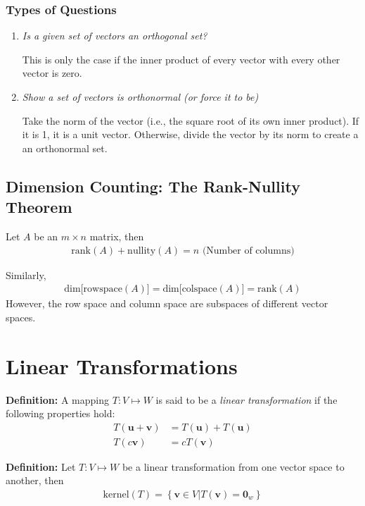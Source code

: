 \documentclass[a4paper,10pt]{report}
\newcommand{\vb}[1]{\mathbf{#1}}		%
\begin{document}
\subsection{Types of Questions}
\begin{enumerate}
	\item
		\textit{Is a given set of vectors an orthogonal set?}

		This is only the case if the inner product of every vector with every other vector is zero.

	\item
		\textit{Show a set of vectors is orthonormal (or force it to be)}

		Take the norm of the vector (i.e., the square root of its own inner product). If it is 1, it is a unit vector. Otherwise, divide the vector by its norm to create a an orthonormal set.
\end{enumerate}


\section{Dimension Counting: The Rank-Nullity Theorem}
  Let $A$ be an $m\times n$ matrix, then
  \begin{align*}
    \text{rank}(A) + \text{nullity}(A) = n \text{ (Number of columns)}
  \end{align*}

  Similarly,
  \begin{align*}
   \text{dim[rowspace}(A)] = \text{dim[colspace}(A)] = \text{rank}(A)
  \end{align*}
  However, the row space and column space are subspaces of different vector spaces.



\chapter{Linear Transformations}

\textbf{Definition: } A mapping $T: V\mapsto W$ is said to be a \textit{linear transformation} if the following properties hold:
\begin{align*}
 T(\vb{u} + \vb{v}) &= T(\vb{u}) + T(\vb{u}) \\
 T(c\vb{v}) &= cT(\vb{v})
\end{align*}

\textbf{Definition: } Let $T: V\mapsto W$ be a linear transformation from one vector space to another, then
\begin{align*}
 \text{kernel}(T)=\left\{\vb{v}\in V | T(\vb{v}) = \vb{0}_w\right\}
\end{align*}
\end{document}
